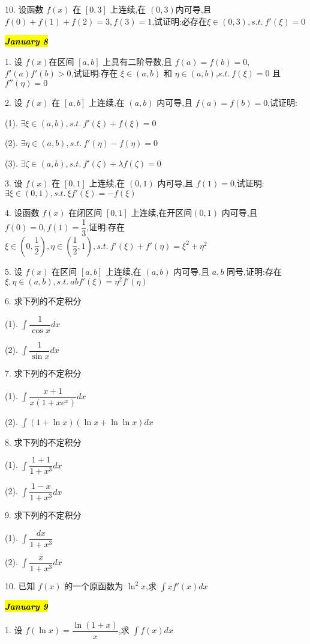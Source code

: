 10. 设函数 $f(x)$ 在 $[0,3]$ 上连续,在 $(0,3)$内可导,且 $f(0)+f(1)+f(2)=3,f(3)=1$,试证明:必存在$\xi\in(0,3),s.t.\ f'(\xi)=0$

\hl{\textbf{\textit{January 8}}}

1. 设 $f(x)$在区间 $[a,b]$ 上具有二阶导数,且 $f(a)=f(b)=0$,$f'(a)f'(b)>0$,试证明:存在 $\xi\in(a,b)$ 和 $\eta\in(a,b)$,$s.t.\ f(\xi)=0$ 且 $f''(\eta)=0$

2. 设 $f(x)$ 在 $[a,b]$ 上连续,在 $(a,b)$ 内可导,且 $f(a)=f(b)=0$,试证明:

(1). $\exists \xi\in(a,b),s.t.\ f'(\xi)+f(\xi)=0$

(2). $\exists \eta\in(a,b),s.t.\ f'(\eta)-f(\eta)=0$

(3). $\exists \zeta\in(a,b),s.t.\ f'(\zeta)+\lambda f(\zeta)=0$

3. 设 $f(x)$ 在 $[0,1]$ 上连续,在 $(0,1)$ 内可导,且 $f(1)=0$,试证明:$\exists \xi\in(0,1),s.t.\ \xi f'(\xi)=-f(\xi)$

4. 设函数 $f(x)$ 在闭区间 $[0,1]$ 上连续,在开区间$(0,1)$ 内可导,且$f(0)=0,f(1)=\dfrac{1}{3}$,证明:存在 $\xi\in\left(0,\dfrac{1}{2}\right),\eta\in\left( \dfrac{1}{2},1\right),s.t.\ f'(\xi)+f'(\eta)=\xi^{2}+\eta^{2}$

5. 设 $f(x)$ 在区间 $[a,b]$ 上连续,在 $(a,b)$ 内可导,且 $a,b$ 同号,证明:存在$\xi,\eta\in(a,b),s.t.\ abf'(\xi)=\eta^{2}f'(\eta)$

6. 求下列的不定积分

(1). $\int \dfrac{1}{\cos x}dx$

(2). $\int \dfrac{1}{\sin x}dx$

7. 求下列的不定积分

(1). $\int \dfrac{x+1}{x(1+xe^{x})}dx$

(2). $\int (1+\ln x)(\ln x+\ln\ln x)dx$

8. 求下列的不定积分

(1). $\int \dfrac{1+1}{1+x^{3}}dx$

(2). $\int \dfrac{1-x}{1+x^{3}}dx$

9. 求下列的不定积分

(1). $\int \dfrac{dx}{1+x^{3}}$

(2). $\int \dfrac{x}{1+x^{3}}dx$

10. 已知 $f(x)$ 的一个原函数为 $\ln^{2}x$,求 $\int xf'(x)dx$

\hl{\textbf{\textit{January 9}}}

1. 设 $f(\ln x)=\dfrac{\ln(1+x)}{x}$,求 $\int f(x)dx$

